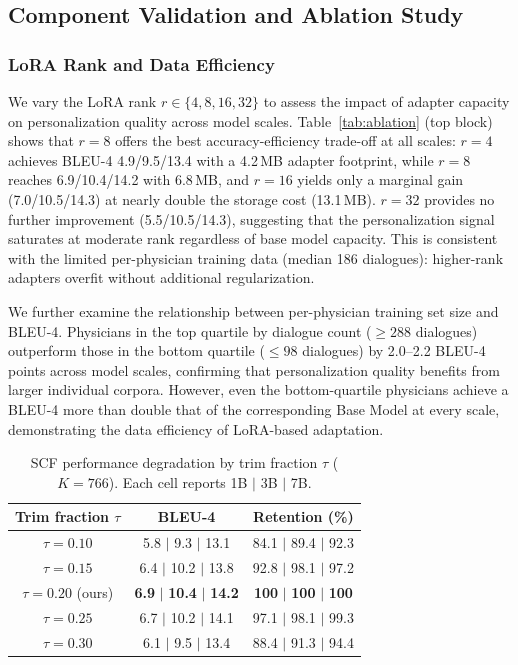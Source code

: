 \subsection*{Component Validation and Ablation Study}

\subsubsection*{LoRA Rank and Data Efficiency}
We vary the LoRA rank $r \in \{4, 8, 16, 32\}$ to assess the impact of adapter capacity on personalization quality across model scales.
Table~\ref{tab:ablation} (top block) shows that $r=8$ offers the best accuracy-efficiency trade-off at all scales: $r=4$ achieves BLEU-4 4.9/9.5/13.4 with a 4.2\,MB adapter footprint, while $r=8$ reaches 6.9/10.4/14.2 with 6.8\,MB, and $r=16$ yields only a marginal gain (7.0/10.5/14.3) at nearly double the storage cost (13.1\,MB).
$r=32$ provides no further improvement (5.5/10.5/14.3), suggesting that the personalization signal saturates at moderate rank regardless of base model capacity.
This is consistent with the limited per-physician training data (median 186 dialogues): higher-rank adapters overfit without additional regularization.

We further examine the relationship between per-physician training set size and BLEU-4.
Physicians in the top quartile by dialogue count ($\ge 288$ dialogues) outperform those in the bottom quartile ($\le 98$ dialogues) by 2.0--2.2 BLEU-4 points across model scales, confirming that personalization quality benefits from larger individual corpora.
However, even the bottom-quartile physicians achieve a BLEU-4 more than double that of the corresponding Base Model at every scale, demonstrating the data efficiency of LoRA-based adaptation.


\begin{table}[t]
\renewcommand\arraystretch{1.06}
\centering
\caption{SCF performance degradation by trim fraction $\tau$ ($K=766$). Each cell reports 1B $|$ 3B $|$ 7B.}
\label{tab:scf_retention}
\begin{tabular}{c|cc}
\toprule
\textbf{Trim fraction $\tau$} & \textbf{BLEU-4} & \textbf{Retention (\%)} \\
\midrule
$\tau=0.10$ & 5.8 $|$ 9.3 $|$ 13.1 & 84.1 $|$ 89.4 $|$ 92.3 \\
$\tau=0.15$ & 6.4 $|$ 10.2 $|$ 13.8 &  92.8 $|$ 98.1 $|$ 97.2 \\
\rowcolor{blue!5}
$\tau=0.20$ (ours) & \textbf{6.9} $|$ \textbf{10.4} $|$ \textbf{14.2} & \textbf{100} $|$ \textbf{100} $|$ \textbf{100} \\
$\tau=0.25$ & 6.7 $|$ 10.2 $|$ 14.1 & 97.1 $|$ 98.1 $|$ 99.3 \\
$\tau=0.30$ & 6.1 $|$ 9.5 $|$ 13.4 & 88.4 $|$ 91.3 $|$ 94.4 \\
\bottomrule
\end{tabular}
\end{table}

